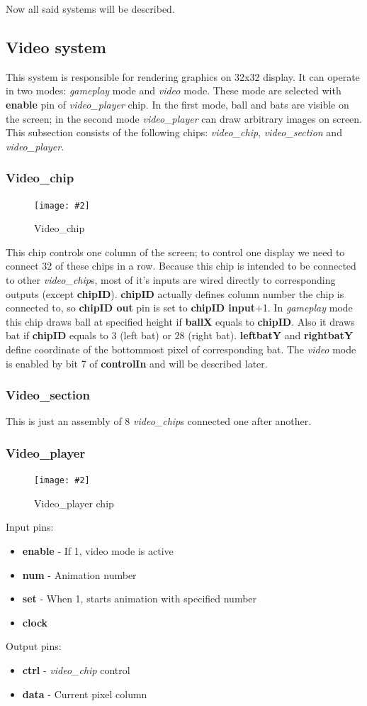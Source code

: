 \documentclass[12pt,a4paper]{article}
\newcommand{\dofigure}[3][H]{
    \begin{figure}[#1]
        \centering
        \texttt{[image: \#2]}
        \caption{#3}
    \end{figure}
}
\newcommand{\chip}[1]{{\itshape#1}}
\newcommand{\pin}[1]{\textbf{#1}}
\newenvironment{pins}{
    
    \let\oldpin\pin
    \renewcommand{\pin}[1]{\item\oldpin{##1}}
    \newcommand{\inputs}[1]{
        
    Input pins:\begin{itemize}##1\end{itemize}}
    \newcommand{\outputs}[1]{
        
    Output pins:\begin{itemize}##1\end{itemize}}
}{}
\begin{document}
    

    Now all said systems will be described.

    

    \subsection{Video system}
    This system is responsible for rendering graphics on 32x32 display. It can operate in two modes: {\itshape gameplay} mode and {\itshape video} mode. These mode are selected with \pin{enable} pin of \chip{video\_player} chip. In the first mode, ball and bats are visible on the screen; in the second mode \chip{video\_player} can draw arbitrary images on screen. This subsection consists of the following chips: 
    \chip{video\_chip}, \chip{video\_section} and \chip{video\_player}.

    \subsubsection{Video\_chip}
    \dofigure{video_chip}{Video\_chip}
    This chip controls one column of the screen; to control one display we need to connect 32 of these chips in a row. Because this chip is intended to be connected to other \chip{video\_chip}s, most of it's inputs are wired directly to corresponding outputs (except \pin{chipID}). \pin{chipID} actually defines column number the chip is connected to, so \pin{chipID out} pin is set to \pin{chipID input}+1.
    In {\itshape gameplay} mode this chip draws ball at specified height if \pin{ballX}  equals to \pin{chipID}. Also it draws bat if \pin{chipID} equals to 3 (left bat) or 28 (right bat). \pin{leftbatY} and \pin{rightbatY} define coordinate of the bottommost pixel of corresponding bat. The {\itshape video} mode is enabled by bit 7 of \pin{controlIn} and will be described later.

    \subsubsection{Video\_section}
    This is just an assembly of 8 \chip{video\_chip}s connected one after another. 

    \subsubsection{Video\_player}
    \dofigure{video_player}{Video\_player chip}
    \begin{pins}
        \inputs{
            \pin{enable} - If 1, video mode is active
            \pin {num} - Animation number
            \pin {set} - When 1, starts animation with specified number
            \pin {clock} 
        }

        \outputs{
            \pin {ctrl} - \chip{video\_chip} control
            \pin {data} - Current pixel column
        }
    \end{pins}
\end{document}
